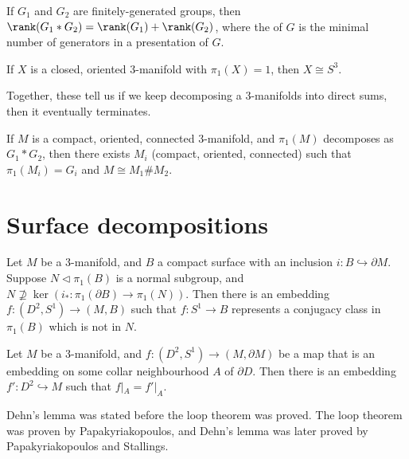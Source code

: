 \documentclass[a4paper]{article}
\begin{document}

\begin{thm}
  If $G_1$ and $G_2$ are finitely-generated groups, then $\rank(G_1 * G_2) = \rank(G_1) + \rank(G_2)$, where the  of $G$ is the minimal number of generators in a presentation of $G$.
\end{thm}

\begin{thm}
  If $X$ is a closed, oriented $3$-manifold with $\pi_1(X) = 1$, then $X \cong S^3$.
\end{thm}

Together, these tell us if we keep decomposing a $3$-manifolds into direct sums, then it eventually terminates.

\begin{thm}
  If $M$ is a compact, oriented, connected $3$-manifold, and $\pi_1(M)$ decomposes as $G_1 * G_2$, then there exists $M_i$ (compact, oriented, connected) such that $\pi_1(M_i) = G_i$ and $M \cong M_1 \# M_2$.
\end{thm}

\section{Surface decompositions}
\begin{thm}
  Let $M$ be a $3$-manifold, and $B$ a compact surface with an inclusion $i: B \hookrightarrow \partial M$. Suppose $N \lhd \pi_1(B)$ is a normal subgroup, and $N \not\supseteq \ker (i_*: \pi_1(\partial B) \to \pi_1(N))$. Then there is an embedding $f: (D^2, S^1) \to (M, B)$ such that $f: S^1 \to B$ represents a conjugacy class in $\pi_1(B)$ which is not in $N$.
\end{thm}

\begin{cor}
  Let $M$ be a $3$-manifold, and $f: (D^2, S^1) \to (M, \partial M)$ be a map that is an embedding on some collar neighbourhood $A$ of $\partial D$. Then there is an embedding $f': D^2 \hookrightarrow M$ such that $f|_A = f'|_A$.
\end{cor}
Dehn's lemma was stated before the loop theorem was proved. The loop theorem was proven by Papakyriakopoulos, and Dehn's lemma was later proved by Papakyriakopoulos and Stallings.
\end{document}
